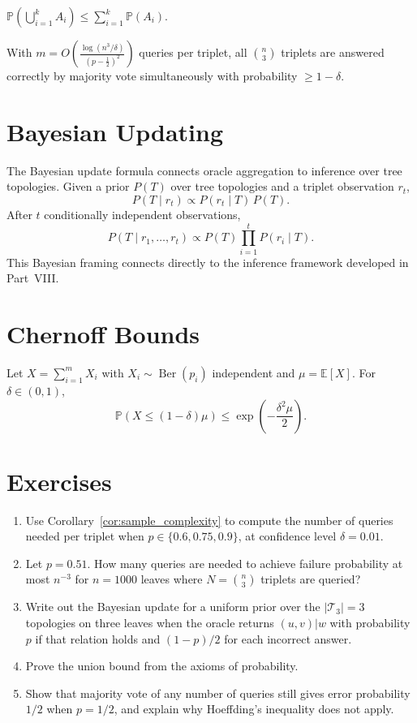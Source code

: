 \begin{lemma}
\label{lem:union_bound}
$\mathbb{P}\!\left(\bigcup_{i=1}^k A_i\right) \leq \sum_{i=1}^k \mathbb{P}(A_i)$.
\end{lemma}

\begin{corollary}
\label{cor:uniform_concentration}
With $m = O\!\left(\frac{\log(n^3/\delta)}{(p-\frac{1}{2})^2}\right)$ queries per triplet, all $\binom{n}{3}$ triplets are answered correctly by majority vote simultaneously with probability $\geq 1 - \delta$.
\end{corollary}

\section{Bayesian Updating}

The Bayesian update formula connects oracle aggregation to inference over tree topologies. Given a prior $P(T)$ over tree topologies and a triplet observation $r_t$,
\[
P(T \mid r_t) \propto P(r_t \mid T) \, P(T).
\]
After $t$ conditionally independent observations,
\[
P(T \mid r_1, \ldots, r_t) \propto P(T) \prod_{i=1}^t P(r_i \mid T).
\]
This Bayesian framing connects directly to the inference framework developed in Part~VIII.

\section{Chernoff Bounds}

\begin{theorem}
\label{thm:chernoff}
Let $X = \sum_{i=1}^m X_i$ with $X_i \sim \operatorname{Ber}(p_i)$ independent and $\mu = \mathbb{E}[X]$. For $\delta \in (0,1)$,
\[
\mathbb{P}(X \leq (1-\delta)\mu) \leq \exp\!\left(-\frac{\delta^2 \mu}{2}\right).
\]
\end{theorem}

\section{Exercises}

\begin{enumerate}
  \item Use Corollary~\ref{cor:sample_complexity} to compute the number of queries needed per triplet when $p \in \{0.6, 0.75, 0.9\}$, at confidence level $\delta = 0.01$.
  \item Let $p = 0.51$. How many queries are needed to achieve failure probability at most $n^{-3}$ for $n = 1000$ leaves where $N = \binom{n}{3}$ triplets are queried?
  \item Write out the Bayesian update for a uniform prior over the $|\mathcal{T}_3| = 3$ topologies on three leaves when the oracle returns $(u,v)|w$ with probability $p$ if that relation holds and $(1-p)/2$ for each incorrect answer.
  \item Prove the union bound from the axioms of probability.
  \item Show that majority vote of any number of queries still gives error probability $1/2$ when $p = 1/2$, and explain why Hoeffding's inequality does not apply.
\end{enumerate}
